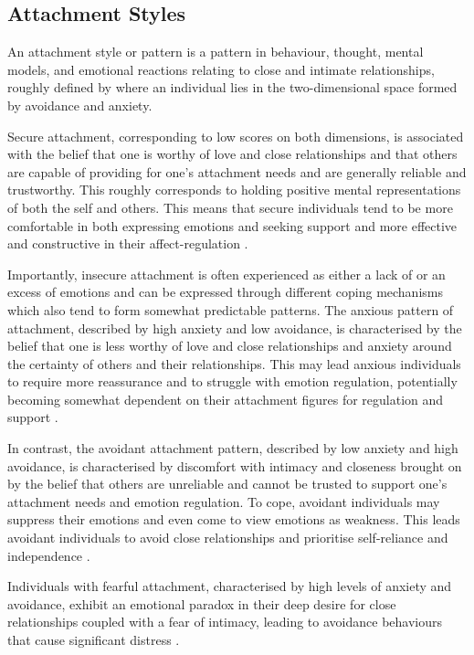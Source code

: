 \documentclass[12pt]{report}
\begin{document}
\subsection*{Attachment Styles}
An attachment style or pattern is a pattern in behaviour, thought, mental models, and emotional reactions relating to close and intimate relationships, roughly defined by where an individual lies in the two-dimensional space formed by avoidance and anxiety.

Secure attachment, corresponding to low scores on both dimensions, is associated with the belief that one is worthy of love and close relationships and that others are capable of providing for one's attachment needs and are generally reliable and trustworthy.
This roughly corresponds to holding positive mental representations of both the self and others.
This means that secure individuals tend to be more comfortable in both expressing emotions and seeking support and more effective and constructive in their affect-regulation \cite{Mikulincer2003}.

Importantly, insecure attachment is often experienced as either a lack of or an excess of emotions and can be expressed through different coping mechanisms which also tend to form somewhat predictable patterns.
The anxious pattern of attachment, described by high anxiety and low avoidance, is characterised by the belief that one is less worthy of love and close relationships and anxiety around the certainty of others and their relationships.
This may lead anxious individuals to require more reassurance and to struggle with emotion regulation, potentially becoming somewhat dependent on their attachment figures for regulation and support .

In contrast, the avoidant attachment pattern, described by low anxiety and high avoidance, is characterised by discomfort with intimacy and closeness brought on by the belief that others are unreliable and cannot be trusted to support one's attachment needs and emotion regulation.
To cope, avoidant individuals may suppress their emotions and even come to view emotions as weakness.
This leads avoidant individuals to avoid close relationships and prioritise self-reliance and independence \cite{Mikulincer2013,Hudson2020}.

Individuals with fearful attachment, characterised by high levels of anxiety and avoidance, exhibit an emotional paradox in their deep desire for close relationships coupled with a fear of intimacy, leading to avoidance behaviours that cause significant distress \cite{Bartholomew1991}.
\end{document}
